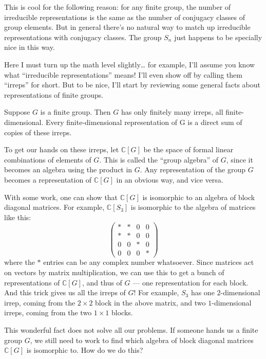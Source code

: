 \documentclass{article}
\begin{document}
This is cool for the following reason: for any finite group, the number
of irreducible representations is the same as the number of conjugacy
classes of group elements. But in general there's no natural way to
match up irreducible representations with conjugacy classes. The group
\(S_n\) just happens to be specially nice in this way.

Here I must turn up the math level slightly\ldots{} for example, I'll
assume you know what ``irreducible representations'' means! I'll even
show off by calling them ``irreps'' for short. But to be nice, I'll
start by reviewing some general facts about representations of finite
groups.

Suppose \(G\) is a finite group. Then \(G\) has only finitely many
irreps, all finite-dimensional. Every finite-dimensional representation
of G is a direct sum of copies of these irreps.

To get our hands on these irreps, let \(\mathbb{C}[G]\) be the space of
formal linear combinations of elements of \(G\). This is called the
``group algebra'' of \(G\), since it becomes an algebra using the
product in \(G\). Any representation of the group \(G\) becomes a
representation of \(\mathbb{C}[G]\) in an obvious way, and vice versa.

With some work, one can show that \(\mathbb{C}[G]\) is isomorphic to an
algebra of block diagonal matrices. For example, \(\mathbb{C}[S_3]\) is
isomorphic to the algebra of matrices like this: \[
  \left(
    \begin{array}{cccc}
      * & * & 0 & 0
    \\* & * & 0 & 0
    \\0 & 0 & * & 0
    \\0 & 0 & 0 & *
    \end{array}
  \right)
\] where the \(*\) entries can be any complex number whatsoever. Since
matrices act on vectors by matrix multiplication, we can use this to get
a bunch of representations of \(\mathbb{C}[G]\), and thus of \(G\) ---
one representation for each block. And this trick gives us all the
irreps of \(G\)! For example, \(S_3\) has one \(2\)-dimensional irrep,
coming from the \(2\times 2\) block in the above matrix, and two
\(1\)-dimensional irreps, coming from the two \(1\times 1\) blocks.

This wonderful fact does not solve all our problems. If someone hands us
a finite group \(G\), we still need to work to find which algebra of
block diagonal matrices \(\mathbb{C}[G]\) is isomorphic to. How do we do
this?
\end{document}
